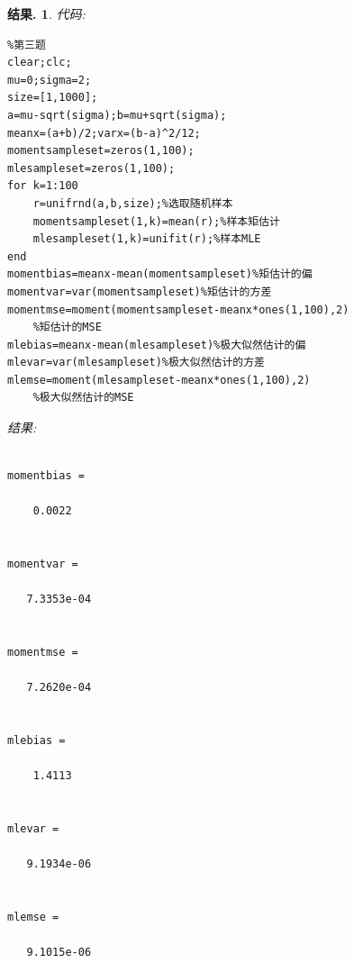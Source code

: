 \documentclass[a4paper,oneside,12pt]{ctexart}
\theoremstyle{plain}
\theoremstyle{nonumberplain}
\newtheorem{solution}{结果.}
\begin{document}
    \begin{solution}
        代码:
        \begin{lstlisting}
%第三题
clear;clc;
mu=0;sigma=2;
size=[1,1000];
a=mu-sqrt(sigma);b=mu+sqrt(sigma);
meanx=(a+b)/2;varx=(b-a)^2/12;
momentsampleset=zeros(1,100);
mlesampleset=zeros(1,100);
for k=1:100
    r=unifrnd(a,b,size);%选取随机样本
    momentsampleset(1,k)=mean(r);%样本矩估计
    mlesampleset(1,k)=unifit(r);%样本MLE
end
momentbias=meanx-mean(momentsampleset)%矩估计的偏
momentvar=var(momentsampleset)%矩估计的方差
momentmse=moment(momentsampleset-meanx*ones(1,100),2)
    %矩估计的MSE
mlebias=meanx-mean(mlesampleset)%极大似然估计的偏
mlevar=var(mlesampleset)%极大似然估计的方差
mlemse=moment(mlesampleset-meanx*ones(1,100),2)
    %极大似然估计的MSE
        \end{lstlisting}

        结果:
        \begin{lstlisting}

momentbias =

    0.0022


momentvar =

   7.3353e-04


momentmse =

   7.2620e-04


mlebias =

    1.4113


mlevar =

   9.1934e-06


mlemse =

   9.1015e-06

        \end{lstlisting}
    \end{solution}
\end{document}
